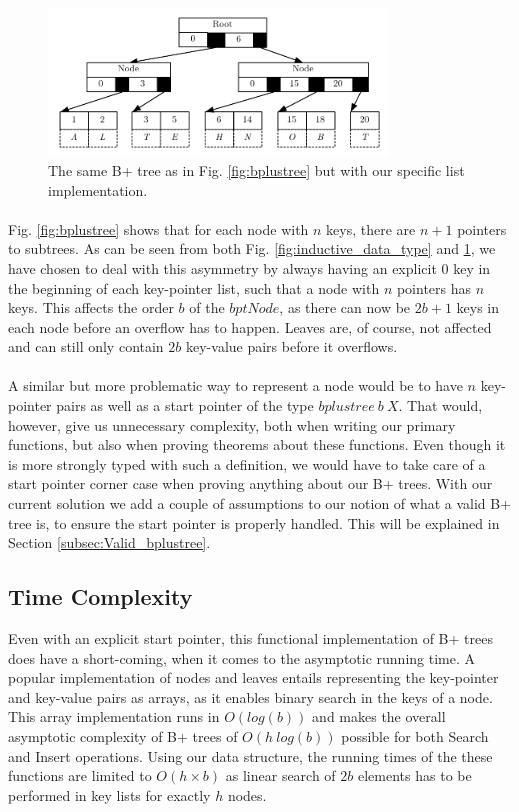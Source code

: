\begin{figure}
 \centering
   \includegraphics[width=90mm]{diagrams/BPlusTreeImpl.pdf}
 \caption{The same B+ tree as in Fig. \ref{fig:bplustree} but with our specific list implementation.}
 \label{fig:bplustreeImpl}
\end{figure}

\paragraph{}
Fig. \ref{fig:bplustree} shows that for each node with $n$ keys, there are $n+1$ pointers to subtrees. As can be seen from both Fig. \ref{fig:inductive_data_type} and \ref{fig:bplustreeImpl}, we have chosen to deal with this asymmetry by always having an explicit $0$ key in the beginning of each key-pointer list, such that a node with $n$ pointers has $n$ keys. This affects the order $b$ of the $bptNode$, as there can now be $2b+1$ keys in each node before an overflow has to happen. Leaves are, of course, not affected and can still only contain $2b$ key-value pairs before it overflows.
\paragraph{}
A similar but more problematic way to represent a node would be to have $n$ key-pointer pairs as well as a start pointer of the type $bplustree~b~X$. That would, however, give us unnecessary complexity, both when writing our primary functions, but also when proving theorems about these functions. Even though it is more strongly typed with such a definition, we would have to take care of a start pointer corner case when proving anything about our B+ trees. With our current solution we add a couple of assumptions to our notion of what a valid B+ tree is, to ensure the start pointer is properly handled. This will be explained in Section \ref{subsec:Valid_bplustree}.

\subsection{Time Complexity}
Even with an explicit start pointer, this functional implementation of B+ trees does have a short-coming, when it comes to the asymptotic running time. A popular implementation of nodes and leaves entails representing the key-pointer and key-value pairs as arrays, as it enables binary search in the keys of a node. This array implementation runs in $O(log(b))$ and makes the overall asymptotic complexity of B+ trees of $O(h~log(b))$ possible for both Search and Insert operations. Using our data structure, the running times of the these functions are limited to $O(h\times b)$ as linear search of $2b$ elements has to be performed in key lists for exactly $h$ nodes. 
